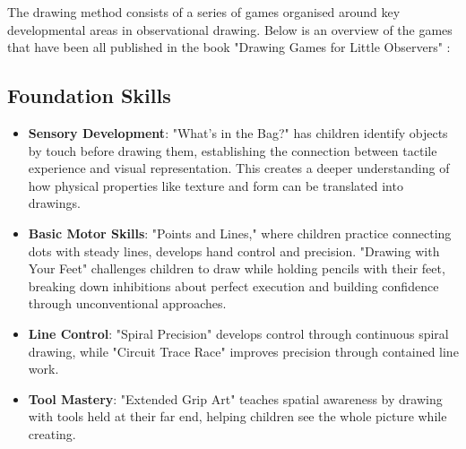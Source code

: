 \documentclass{article}
\begin{document}
The drawing method consists of a series of games organised around key developmental areas in observational drawing. Below is an overview of the games that have been all published in the book "Drawing Games for Little Observers" \cite{salimbeni2024drawing}:

\subsection{Foundation Skills}
\begin{itemize}
    \item \textbf{Sensory Development}: "What's in the Bag?" has children identify objects by touch before drawing them, establishing the connection between tactile experience and visual representation. This creates a deeper understanding of how physical properties like texture and form can be translated into drawings.
    \item \textbf{Basic Motor Skills}: "Points and Lines," where children practice connecting dots with steady lines, develops hand control and precision. "Drawing with Your Feet" challenges children to draw while holding pencils with their feet, breaking down inhibitions about perfect execution and building confidence through unconventional approaches.
    \item \textbf{Line Control}: "Spiral Precision" develops control through continuous spiral drawing, while "Circuit Trace Race" improves precision through contained line work.
    \item \textbf{Tool Mastery}: "Extended Grip Art" teaches spatial awareness by drawing with tools held at their far end, helping children see the whole picture while creating.
\end{itemize}
\end{document}
